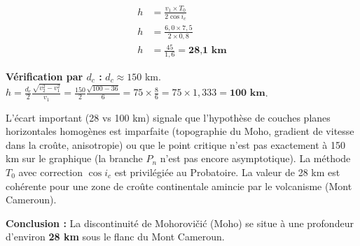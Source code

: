 \documentclass[11pt]{article}
\begin{document}
\begin{exoresolu}
\begin{enumerate}
    \begin{align*}
        h &= \frac{v_1 \times T_0}{2 \cos i_c} \\
        h &= \frac{6,0 \times 7,5}{2 \times 0,8} \\
        h &= \frac{45}{1,6} = \textbf{28,1 km}
    \end{align*}
    
    \textbf{Vérification par $d_c$ :} $d_c \approx 150$ km.
    $h = \frac{d_c}{2} \frac{\sqrt{v_2^2 - v_1^2}}{v_1} = \frac{150}{2} \frac{\sqrt{100 - 36}}{6} = 75 \times \frac{8}{6} = 75 \times 1,333 = \textbf{100 km}$.
    \begin{attention}L'écart important (28 vs 100 km) signale que l'hypothèse de couches planes horizontales homogènes est imparfaite (topographie du Moho, gradient de vitesse dans la croûte, anisotropie) ou que le point critique n'est pas exactement à 150 km sur le graphique (la branche $P_n$ n'est pas encore asymptotique). La méthode $T_0$ avec correction $\cos i_c$ est privilégiée au Probatoire. La valeur de 28 km est cohérente pour une zone de croûte continentale amincie par le volcanisme (Mont Cameroun).\end{attention}
    \textbf{Conclusion :} La discontinuité de Mohorovičić (Moho) se situe à une profondeur d'environ \textbf{28 km} sous le flanc du Mont Cameroun.
\end{enumerate}
\end{exoresolu}
\end{document}
